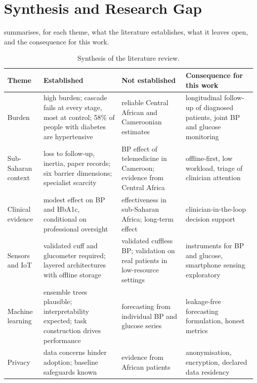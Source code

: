 \documentclass[12pt,a4paper,oneside]{report}
\begin{document}
\section{Synthesis and Research Gap}\label{sec:positioning}

 summarises, for each theme, what the literature establishes, what it leaves open, and the consequence for this work.

\begin{table}[htbp]
\centering\footnotesize
\caption{Synthesis of the literature review.}\label{tab:lr-synthesis}
\begin{tabularx}{\textwidth}{@{}>{\raggedright\arraybackslash}p{2.3cm} >{\raggedright\arraybackslash}X >{\raggedright\arraybackslash}X >{\raggedright\arraybackslash}X@{}}
\toprule
\textbf{Theme} & \textbf{Established} & \textbf{Not established} & \textbf{Consequence for this work} \\
\midrule
Burden & high burden; cascade fails at every stage, most at control; 58\% of people with diabetes are hypertensive & reliable Central African and Cameroonian estimates & longitudinal follow-up of diagnosed patients, joint BP and glucose monitoring \\
Sub-Saharan context & loss to follow-up, inertia, paper records; six barrier dimensions; specialist scarcity & BP effect of telemedicine in Cameroon; evidence from Central Africa & offline-first, low workload, triage of clinician attention \\
Clinical evidence & modest effect on BP and HbA1c, conditional on professional oversight & effectiveness in sub-Saharan Africa; long-term effect & clinician-in-the-loop decision support \\
Sensors and IoT & validated cuff and glucometer required; layered architectures with offline storage & validated cuffless BP; validation on real patients in low-resource settings & instruments for BP and glucose, smartphone sensing exploratory \\
Machine learning & ensemble trees plausible; interpretability expected; task construction drives performance & forecasting from individual BP and glucose series & leakage-free forecasting formulation, honest metrics \\
Privacy & data concerns hinder adoption; baseline safeguards known & evidence from African patients & anonymisation, encryption, declared data residency \\
\bottomrule
\end{tabularx}
\end{table}
\end{document}
